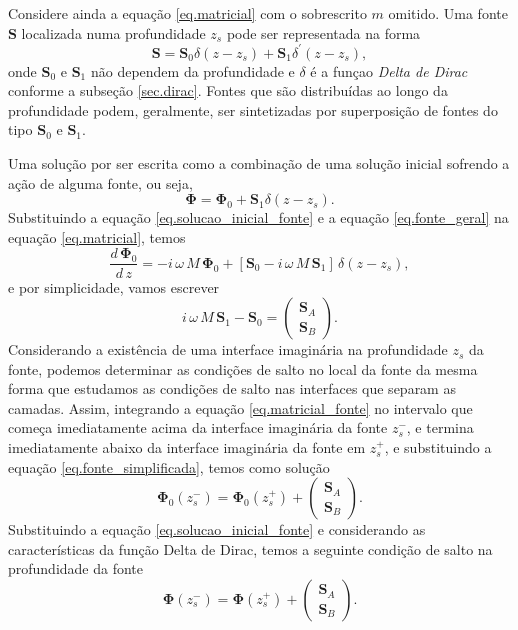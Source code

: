 Considere ainda a equa\c{c}\~ao \ref{eq.matricial} com o sobrescrito $m$ omitido. Uma fonte $\mathbf{S}$ localizada numa profundidade $z_s$ pode ser representada na forma
\begin{equation}\label{eq.fonte_geral}
\mathbf{S}=\mathbf{S}_0\delta(z-z_s)+\mathbf{S}_1\delta^\prime(z-z_s),
\end{equation}
onde $\mathbf{S}_0$ e $\mathbf{S}_1$ n\~ao dependem da profundidade e $\delta$ \'e a fun\c{c}ao \textit{Delta de Dirac} conforme a subse\c{c}\~ao \ref{sec.dirac}. Fontes que s\~ao distribu\'idas ao longo da profundidade podem, geralmente, ser sintetizadas por superposi\c{c}\~ao de fontes do tipo $\mathbf{S}_0$ e $\mathbf{S}_1$. 

Uma solu\c{c}\~ao por ser escrita como a combina\c{c}\~ao de uma solu\c{c}\~ao inicial sofrendo a a\c{c}\~ao de alguma fonte, ou seja,
\begin{equation}\label{eq.solucao_inicial_fonte}
\mathbf{\Phi}=\mathbf{\Phi}_0+\mathbf{S}_1\delta(z-z_s).
\end{equation} 
Substituindo a equa\c{c}\~ao \ref{eq.solucao_inicial_fonte} e a equa\c{c}\~ao \ref{eq.fonte_geral} na equa\c{c}\~ao \ref{eq.matricial}, temos
\begin{equation}\label{eq.matricial_fonte}
\frac{d\,\mathbf{\Phi}_0}{d\,z}=-i\,\omega\,M\,\mathbf{\Phi}_0+\left[\mathbf{S}_0-i\,\omega\,M\,\mathbf{S}_1\right]\,\delta(z-z_s),
\end{equation}
e por simplicidade, vamos escrever
\begin{equation}\label{eq.fonte_simplificada}
i\,\omega\,M\,\mathbf{S}_1-\mathbf{S}_0=
\begin{pmatrix}
\mathbf{S}_A\\
\mathbf{S}_B
\end{pmatrix}.
\end{equation}
Considerando a exist\^encia de uma interface imagin\'aria na profundidade $z_s$ da fonte, podemos determinar as condi\c{c}\~oes de salto no local da fonte da mesma forma que estudamos as condi\c{c}\~oes de salto nas interfaces que separam as camadas. Assim, integrando a equa\c{c}\~ao \ref{eq.matricial_fonte} no intervalo que come\c{c}a imediatamente acima da interface imagin\'aria da fonte $z_s^-$, e termina imediatamente abaixo da interface imagin\'aria da fonte em $z_s^+$, e substituindo a equa\c{c}\~ao \ref{eq.fonte_simplificada}, temos como solu\c{c}\~ao
\begin{equation*}
\mathbf{\Phi}_0(z_s^-)=\mathbf{\Phi}_0(z_s^+)+
\begin{pmatrix}
\mathbf{S}_A\\
\mathbf{S}_B
\end{pmatrix}.
\end{equation*}
Substituindo a equa\c{c}\~ao \ref{eq.solucao_inicial_fonte} e considerando as caracter\'isticas da fun\c{c}\~ao Delta de Dirac, temos a seguinte condi\c{c}\~ao de salto na profundidade da fonte
\begin{equation}\label{eq.salto_zs}
\mathbf{\Phi}(z_s^-)=\mathbf{\Phi}(z_s^+)+
\begin{pmatrix}
\mathbf{S}_A\\
\mathbf{S}_B
\end{pmatrix}.
\end{equation}

